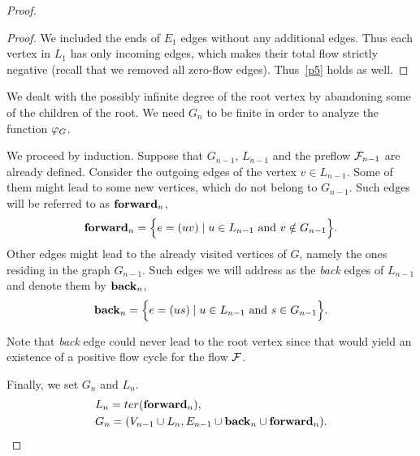 \documentclass[12pt,oneside,a4paper]{amsart}
\begin{document}
\begin{proof}
\begin{proof}
          We included the ends of $E_1$ edges without any additional edges.
          Thus each vertex in $L_1$ has only incoming edges, which makes their
            total flow strictly negative (recall that we removed all zero-flow edges).
          Thus~\ref{p5} holds as well.
        \end{proof}
        \begin{remark}
          We dealt with the possibly infinite degree of the root vertex by abandoning some of the children of the root.
          We need $G_n$ to be finite in order to analyze the function $\varphi_{G}$.
        \end{remark}

        We proceed by induction.
        Suppose that $G_{n-1}$, $L_{n-1}$ and the preflow $\mathcal{F}_{n-1}$ are already defined.
        Consider the outgoing edges of the vertex $v \in L_{n-1}$.
        Some of them might lead to some new vertices, which do not belong to $G_{n-1}$.
        Such edges will be referred to as $\mathbf{forward}_n$,
        \[
          \mathbf{forward}_n = \Big\{ e = (uv) \mid u \in L_{n-1} \text{ and } v \notin G_{n-1}\Big\}.
        \]
        Other edges might lead to the already visited vertices of $G$, namely the ones residing in the graph $G_{n-1}$.
        Such edges we will address as the \emph{back} edges of $L_{n-1}$ and denote them by $\mathbf{back}_n$,
        \[
          \mathbf{back}_n = \Big\{e = (us) \mid u \in L_{n-1} \text{ and } s \in G_{n-1}\Big\}.
        \]
        \begin{remark}
          Note that \emph{back} edge could never lead to the root vertex since that
            would yield an existence of a positive flow cycle for the flow $\mathcal{F}$.
        \end{remark}
        Finally, we set $G_n$ and $L_n$.
        \begin{align*}
          &L_n = ter(\mathbf{forward}_n),\\
          &G_n = (V_{n-1} \cup L_n, E_{n-1} \cup \mathbf{back}_n \cup \mathbf{forward}_n).
        \end{align*}

      \medskip

\end{proof}
\end{document}
